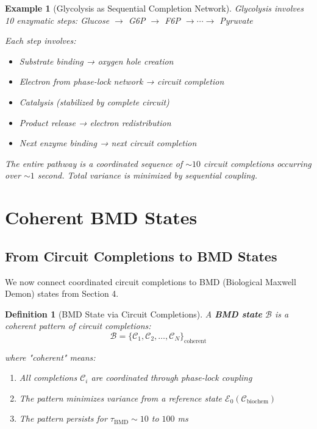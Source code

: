 \documentclass[12pt,a4paper]{article}
\newtheorem{definition}{Definition}
\newtheorem{example}{Example}
\begin{document}
\begin{example}[Glycolysis as Sequential Completion Network]
Glycolysis involves 10 enzymatic steps: Glucose $\to$ G6P $\to$ F6P $\to \cdots \to$ Pyruvate

Each step involves:
\begin{itemize}
\item Substrate binding → oxygen hole creation
\item Electron from phase-lock network → circuit completion
\item Catalysis (stabilized by complete circuit)
\item Product release → electron redistribution
\item Next enzyme binding → next circuit completion
\end{itemize}

The entire pathway is a coordinated sequence of $\sim 10$ circuit completions occurring over $\sim 1$ second. Total variance is minimized by sequential coupling.
\end{example}

\section{Coherent BMD States}

\subsection{From Circuit Completions to BMD States}

We now connect coordinated circuit completions to BMD (Biological Maxwell Demon) states from Section 4.

\begin{definition}[BMD State via Circuit Completions]
\label{def:bmd_via_circuits}
A \textbf{BMD state} $\mathcal{B}$ is a coherent pattern of circuit completions:
\begin{equation}
\mathcal{B} = \{\mathcal{C}_1, \mathcal{C}_2, \ldots, \mathcal{C}_N\}_{\text{coherent}}
\end{equation}

where "coherent" means:
\begin{enumerate}
\item All completions $\mathcal{C}_i$ are coordinated through phase-lock coupling
\item The pattern minimizes variance from a reference state $\mathcal{E}_0(\mathcal{C}_{\text{biochem}})$
\item The pattern persists for $\tau_{\text{BMD}} \sim 10$ to $100$ ms
\end{enumerate}
\end{definition}
\end{document}
